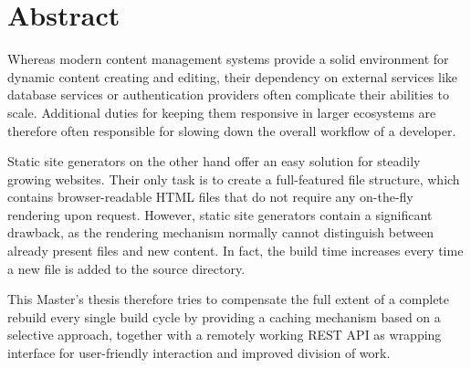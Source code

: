 \chapter{Abstract}

Whereas modern content management systems provide a solid environment for dynamic content creating and editing, their dependency on external services like database services or authentication providers often complicate their abilities to scale. Additional duties for keeping them responsive in larger ecosystems are therefore often responsible for slowing down the overall workflow of a developer.

Static site generators on the other hand offer an easy solution for steadily growing websites. Their only task is to create a full-featured file structure, which contains browser-readable HTML files that do not require any on-the-fly rendering upon request. However, static site generators contain a significant drawback, as the rendering mechanism normally cannot distinguish between already present files and new content. In fact, the build time increases every time a new file is added to the source directory.

This Master's thesis therefore tries to compensate the full extent of a complete rebuild every single build cycle by providing a caching mechanism based on a selective approach, together with a remotely working REST API as wrapping interface for user-friendly interaction and improved division of work.
